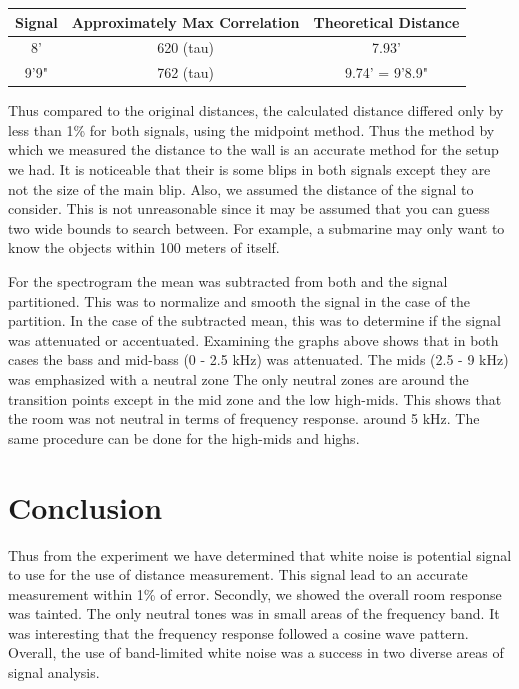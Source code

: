 \documentclass{article}
\begin{document}
      \begin{tabular}{|c|c|c|}
         \hline
         Signal & Approximately Max Correlation & Theoretical Distance \\
         \hline
         8' & 620 (tau) & 7.93'\\
         9'9" & 762 (tau) & 9.74' = 9'8.9"\\
         \hline
      \end{tabular}

      Thus compared to the original distances, the calculated distance differed
      only by less than 1\% for both signals, using the midpoint method. Thus
      the method by which we measured the distance to the wall is an accurate
      method for the setup we had. It is noticeable that their is some blips
      in both signals except they are not the size of the main blip. Also, we
      assumed the distance of the signal to consider. This is not unreasonable
      since it may be assumed that you can guess two wide bounds to search
      between. For example, a submarine may only want to know the objects within
      100 meters of itself.

      For the spectrogram the mean was subtracted from both and the signal
      partitioned. This was to normalize and smooth the signal in the case
      of the partition. In the case of the subtracted mean, this was to
      determine if the signal was attenuated or accentuated. Examining the
      graphs above shows that in both cases the bass and mid-bass (0 - 2.5 kHz)
      was attenuated. The mids (2.5 - 9 kHz) was emphasized with a neutral zone
      The only neutral zones are around the transition points except in the
      mid zone and the low high-mids. This shows that the room was not
      neutral in terms of frequency response.
      around 5 kHz. The same procedure can be done for the high-mids and highs. 

   \section{Conclusion}
      Thus from the experiment we have determined that white noise is
      potential signal to use for the use of distance measurement. This
      signal lead to an accurate measurement within 1\% of error. Secondly,
      we showed the overall room response was tainted. The only neutral tones
      was in small areas of the frequency band. It was interesting that the
      frequency response followed a cosine wave pattern. Overall, the use of
      band-limited white noise was a success in two diverse areas of
      signal analysis.
\end{document}
